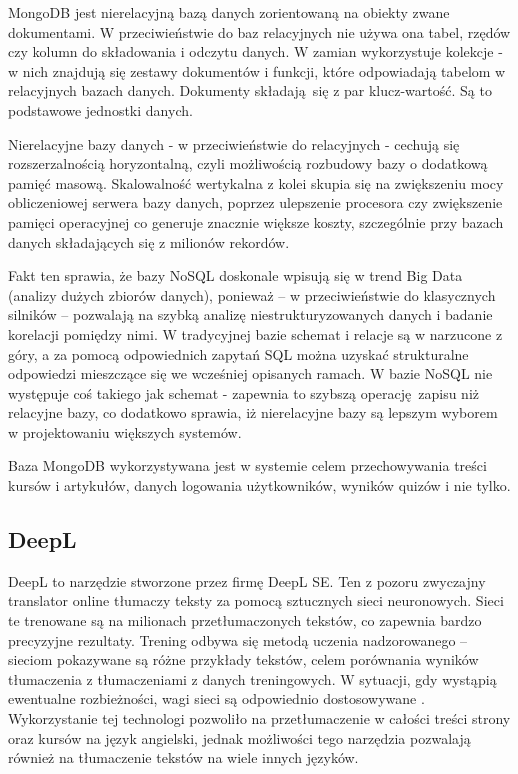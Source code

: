 \documentclass[12pt,twoside]{article}
\begin{document}
MongoDB jest nierelacyjną bazą danych zorientowaną na obiekty zwane dokumentami. W przeciwieństwie do baz relacyjnych nie używa ona tabel, rzędów czy kolumn do składowania i odczytu danych. W zamian wykorzystuje kolekcje - w nich znajdują się zestawy dokumentów i funkcji, które odpowiadają tabelom w relacyjnych bazach danych. Dokumenty składają się z par klucz-wartość. Są to podstawowe jednostki danych. 

Nierelacyjne bazy danych - w przeciwieństwie do relacyjnych - cechują się rozszerzalnością horyzontalną, czyli możliwością rozbudowy bazy o dodatkową pamięć masową. Skalowalność wertykalna z kolei skupia się na zwiększeniu mocy obliczeniowej serwera bazy danych, poprzez ulepszenie procesora czy zwiększenie pamięci operacyjnej co generuje znacznie większe koszty, szczególnie przy bazach danych składających się z milionów rekordów. 

Fakt ten sprawia, że bazy NoSQL doskonale wpisują się w trend Big Data (analizy dużych zbiorów danych), ponieważ – w przeciwieństwie do klasycznych silników – pozwalają na szybką analizę niestrukturyzowanych danych i badanie korelacji pomiędzy nimi. W tradycyjnej bazie schemat i relacje są w narzucone z góry, a za pomocą odpowiednich zapytań SQL można uzyskać strukturalne odpowiedzi mieszczące się we wcześniej opisanych ramach. W bazie NoSQL nie występuje coś takiego jak schemat - zapewnia to szybszą operację zapisu niż relacyjne bazy, co dodatkowo sprawia, iż nierelacyjne bazy są lepszym wyborem w projektowaniu większych systemów.
 
Baza MongoDB wykorzystywana jest w systemie celem przechowywania treści kursów i artykułów, danych logowania użytkowników, wyników quizów i nie tylko.

\subsection{DeepL}
DeepL to narzędzie stworzone przez firmę DeepL SE. Ten z pozoru zwyczajny translator online tłumaczy teksty za pomocą sztucznych sieci neuronowych. Sieci te trenowane są na milionach przetłumaczonych tekstów, co zapewnia bardzo precyzyjne rezultaty. Trening odbywa się metodą uczenia nadzorowanego -- sieciom pokazywane są różne przykłady tekstów, celem porównania wyników tłumaczenia z tłumaczeniami z danych treningowych. W sytuacji, gdy wystąpią ewentualne rozbieżności, wagi sieci są odpowiednio dostosowywane \cite{Deepl}. Wykorzystanie tej technologi pozwoliło na przetłumaczenie w całości treści strony oraz kursów na język angielski, jednak możliwości tego narzędzia pozwalają również na tłumaczenie tekstów na wiele innych języków. 
 
\end{document}
